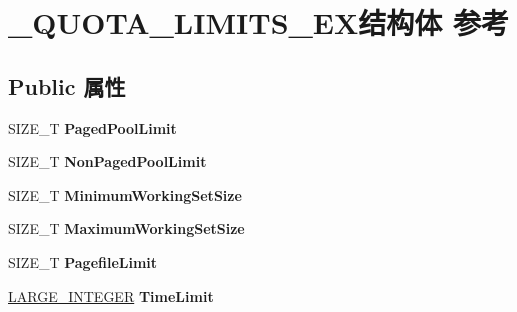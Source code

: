 \hypertarget{struct___q_u_o_t_a___l_i_m_i_t_s___e_x}{}\section{\+\_\+\+Q\+U\+O\+T\+A\+\_\+\+L\+I\+M\+I\+T\+S\+\_\+\+E\+X结构体 参考}
\label{struct___q_u_o_t_a___l_i_m_i_t_s___e_x}
\subsection*{Public 属性}
\begin{DoxyCompactItemize}
\item 
\mbox{\label{struct___q_u_o_t_a___l_i_m_i_t_s___e_x_a79565ebb8f583843425c4f3a389a5da1}} 
S\+I\+Z\+E\+\_\+T {\bfseries Paged\+Pool\+Limit}
\item 
\mbox{\label{struct___q_u_o_t_a___l_i_m_i_t_s___e_x_acb48bbab8ef84fe1d1854b6c896dbfa2}} 
S\+I\+Z\+E\+\_\+T {\bfseries Non\+Paged\+Pool\+Limit}
\item 
\mbox{\label{struct___q_u_o_t_a___l_i_m_i_t_s___e_x_ad085bb8883b3f4830cd14b72315ecf97}} 
S\+I\+Z\+E\+\_\+T {\bfseries Minimum\+Working\+Set\+Size}
\item 
\mbox{\label{struct___q_u_o_t_a___l_i_m_i_t_s___e_x_a1f247852916fa404f2fc595dfbca102a}} 
S\+I\+Z\+E\+\_\+T {\bfseries Maximum\+Working\+Set\+Size}
\item 
\mbox{\label{struct___q_u_o_t_a___l_i_m_i_t_s___e_x_a7e4524e97c04920fbe761ba5becb330f}} 
S\+I\+Z\+E\+\_\+T {\bfseries Pagefile\+Limit}
\item 
\mbox{\label{struct___q_u_o_t_a___l_i_m_i_t_s___e_x_aa9c9cb144c914ec84293757aad889b43}} 
\hyperlink{union___l_a_r_g_e___i_n_t_e_g_e_r}{L\+A\+R\+G\+E\+\_\+\+I\+N\+T\+E\+G\+ER} {\bfseries Time\+Limit}
\item 
\mbox{\label{struct___q_u_o_t_a___l_i_m_i_t_s___e_x_a659c9abb10f987d8d7bd805d937dcab6}} 

\end{DoxyCompactItemize}
